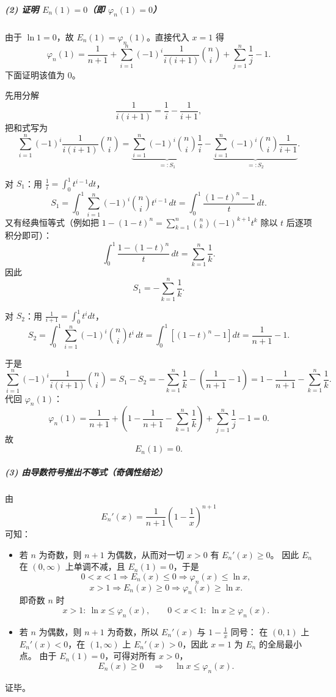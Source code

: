 \documentclass[12pt]{article}
\theoremstyle{definition}
\theoremstyle{plain}
\theoremstyle{definition}
\begin{document}
\subparagraph{(2) 证明 $E_n(1)=0$（即 $\varphi_n(1)=0$）}
由于 $\ln 1=0$，故 $E_n(1)=\varphi_n(1)$。直接代入 $x=1$ 得
\[
\varphi_n(1)=\frac{1}{n+1}+\sum_{i=1}^{n}(-1)^i\frac{1}{i(i+1)}\binom{n}{i}
+\sum_{j=1}^{n}\frac{1}{j}-1.
\]
下面证明该值为 0。

先用分解
\[
\frac{1}{i(i+1)}=\frac{1}{i}-\frac{1}{i+1},
\]
把和式写为
\[
\sum_{i=1}^{n}(-1)^i\frac{1}{i(i+1)}\binom{n}{i}
=\underbrace{\sum_{i=1}^{n}(-1)^i\binom{n}{i}\frac{1}{i}}_{=:S_1}
-\underbrace{\sum_{i=1}^{n}(-1)^i\binom{n}{i}\frac{1}{i+1}}_{=:S_2}.
\]

对 $S_1$：用 $\frac1i=\int_0^1 t^{i-1}dt$，
\[
S_1=\int_0^1\sum_{i=1}^n(-1)^i\binom{n}{i}t^{i-1}\,dt
=\int_0^1\frac{(1-t)^n-1}{t}\,dt.
\]
又有经典恒等式（例如把 $1-(1-t)^n=\sum_{k=1}^n\binom{n}{k}(-1)^{k+1}t^k$ 除以 $t$ 后逐项积分即可）：
\[
\int_0^1\frac{1-(1-t)^n}{t}\,dt=\sum_{k=1}^n\frac{1}{k}.
\]
因此
\[
S_1=-\sum_{k=1}^n\frac{1}{k}.
\]

对 $S_2$：用 $\frac1{i+1}=\int_0^1 t^i dt$，
\[
S_2=\int_0^1\sum_{i=1}^n(-1)^i\binom{n}{i}t^i\,dt
=\int_0^1\left[(1-t)^n-1\right]dt
=\frac{1}{n+1}-1.
\]

于是
\[
\sum_{i=1}^{n}(-1)^i\frac{1}{i(i+1)}\binom{n}{i}
=S_1-S_2
=-\sum_{k=1}^n\frac{1}{k}-\left(\frac{1}{n+1}-1\right)
=1-\frac{1}{n+1}-\sum_{k=1}^n\frac{1}{k}.
\]
代回 $\varphi_n(1)$：
\[
\varphi_n(1)=\frac{1}{n+1}+\left(1-\frac{1}{n+1}-\sum_{k=1}^n\frac{1}{k}\right)+\sum_{j=1}^n\frac{1}{j}-1=0.
\]
故
\[
\boxed{\;E_n(1)=0.\;}
\]

\subparagraph{(3) 由导数符号推出不等式（奇偶性结论）}
由
\[
E_n'(x)=\frac{1}{n+1}\left(1-\frac{1}{x}\right)^{n+1}
\]
可知：

\begin{itemize}
\item 若 $n$ 为奇数，则 $n+1$ 为偶数，从而对一切 $x>0$ 有 $E_n'(x)\ge 0$。
因此 $E_n$ 在 $(0,\infty)$ 上单调不减，且 $E_n(1)=0$，于是
\[
0<x<1\Rightarrow E_n(x)\le 0\Rightarrow \varphi_n(x)\le \ln x,
\]
\[
x>1\Rightarrow E_n(x)\ge 0\Rightarrow \varphi_n(x)\ge \ln x.
\]
即奇数 $n$ 时
\[
x>1:\ \ln x\le\varphi_n(x),\qquad 0<x<1:\ \ln x\ge\varphi_n(x).
\]

\item 若 $n$ 为偶数，则 $n+1$ 为奇数，所以 $E_n'(x)$ 与 $1-\frac1x$ 同号：
在 $(0,1)$ 上 $E_n'(x)<0$，在 $(1,\infty)$ 上 $E_n'(x)>0$，因此 $x=1$ 为 $E_n$ 的全局最小点。
由于 $E_n(1)=0$，可得对所有 $x>0$，
\[
E_n(x)\ge 0\quad\Rightarrow\quad \ln x\le \varphi_n(x).
\]
\end{itemize}
证毕。
\end{document}
